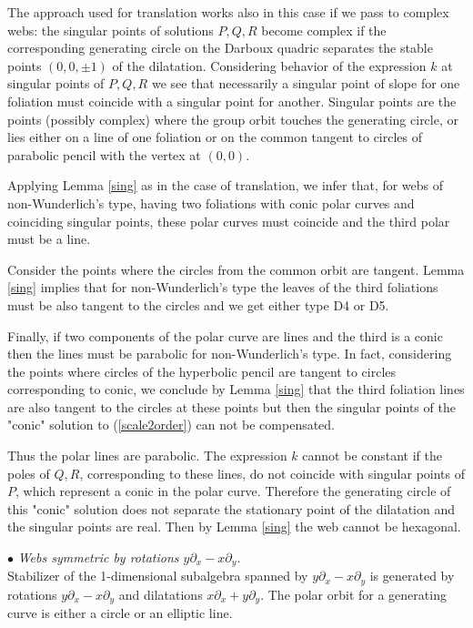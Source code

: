 \documentclass[11pt,a4paper]{article}
\begin{document}
The approach used for translation works also in this case if we pass to complex webs: the singular points of solutions $P,Q,R$ become complex if the corresponding generating circle on the Darboux quadric separates the stable points $(0,0,\pm 1)$ of the dilatation.
Considering behavior of the expression $k$ at singular points of $P,Q,R$ we see that necessarily a singular point of slope for one foliation must coincide with a singular point for another.  Singular points are the points (possibly complex) where the group orbit touches the generating circle, or lies  either on a line of one foliation or on the common tangent to circles of parabolic pencil with the vertex at  $(0,0)$.
 
Applying Lemma \ref{sing} as in the case of translation, we infer that, for webs of non-Wunderlich's type, having two foliations with conic polar curves and coinciding singular points, these polar curves must coincide and the third polar must be a line.   

Consider the points where the circles from the common orbit are tangent. Lemma \ref{sing} implies that for non-Wunderlich's type the leaves of the third foliations must be also tangent to the circles and we get either type D4 or D5.     

Finally, if two components of the  polar curve are lines and the third is a conic then the lines must be parabolic for 
non-Wunderlich's type. In fact, considering the points where circles of the hyperbolic pencil are tangent to circles corresponding to conic, we conclude by Lemma \ref{sing} that the third foliation lines are also tangent to the circles at these points but then the singular points of the "conic" solution to (\ref{scale2order}) can not be compensated.   
 
Thus the polar lines are parabolic. The expression $k$ cannot be constant if the poles of $Q,R$, corresponding to these lines, do not coincide with singular points of $P$, which represent a conic in the polar curve.  Therefore the generating circle of this "conic" solution does not separate the stationary point of the dilatation and the singular points are real. Then by Lemma \ref{sing} the web cannot be hexagonal.  




$\bullet${ \it Webs symmetric by rotations $y\partial_x-x\partial_y$}.\\  
Stabilizer of the 1-dimensional subalgebra spanned by $y\partial_x-x\partial_y$ is generated by rotations $y\partial_x-x\partial_y$ and  dilatations  $x\partial_x+y\partial_y$. The polar orbit for a generating curve is either a circle or an elliptic line.   
\end{document}

